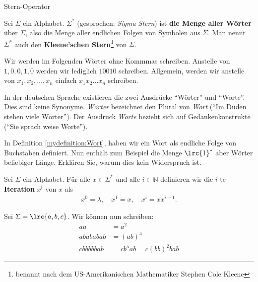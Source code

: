 \begin{frame}[fragile]{Stern-Operator}
\begin{mydefinition}
Sei $\Sigma$ ein Alphabet. $\Sigma^*$ (gesprochen: \textit{Sigma Stern}) ist \textbf{die Menge aller Wörter} über $\Sigma$, also die Menge aller endlichen Folgen von Symbolen aus $\Sigma$. Man nennt $\Sigma^{*}$ auch den \textbf{Kleene'schen Stern}\footnote{benannt nach dem US-Amerikanischen Mathematiker Stephen Cole Kleene} von $\Sigma$. %
\end{mydefinition}
\end{frame}

\begin{frame}[fragile]
Wir werden im Folgenden Wörter ohne Kommmas schreiben. Anstelle von $1,0,0,1,0$ werden wir lediglich $10010$ schreiben. Allgemein, werden wir anstelle von $x_1,x_2,\ldots ,x_n$ einfach $x_1x_2\ldots x_n$ schreiben.
\begin{myremark}
	In der deutschen Sprache existieren die zwei Ausdrücke \enquote{Wörter} und \enquote{Worte}. Dies sind keine Synonyme. \textit{Wörter} bezeichnet den Plural von \textit{Wort} (\enquote{Im Duden stehen viele Wörter}). Der Ausdruck \textit{Worte} bezieht sich auf Gedankenkonstrukte (\enquote{Sie sprach weise Worte}).
\end{myremark}
\end{frame}

\begin{frame}[fragile]
\begin{myexercise}\label{myexercise:0202}
	In Definition \ref{mydefinition:Wort}, haben wir ein Wort als endliche Folge von Buchstaben definiert. Nun enthält zum Beispiel die Menge $\lrc{1}^{*}$ aber Wörter beliebiger Länge. Erklären Sie, warum dies kein Widerspruch ist.
\end{myexercise}
\end{frame}

\begin{frame}[fragile]
\begin{mydefinition}\label{mydefinition:Iteration_Wort}
Sei $\Sigma$ ein Alphabet. Für alle $x\in\Sigma^*$ und alle $i\in\mathbb{N}$ definieren wir die $i$-te \textbf{Iteration} $x^i$ von $x$ als
\begin{align*}
	x^0 = \lambda,\quad x^1 = x, \quad x^i = xx^{i-1}.
\end{align*}
\end{mydefinition}
\begin{myexample}
Sei $\Sigma = \lrc{a,b,c}$. Wir können nun schreiben:
\begin{align*}
	aa       & = a^2                 \\
	abababab & = (ab)^4              \\
	cbbbbbab & = cb^5ab = c(bb)^2bab
\end{align*}
\end{myexample}
\end{frame}

